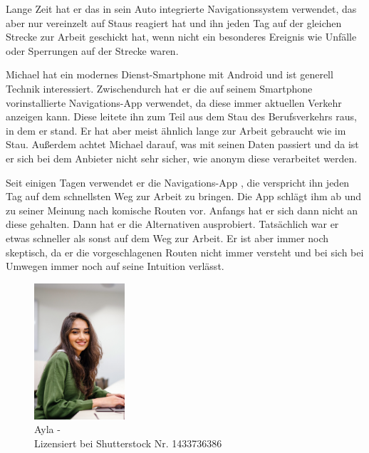 Lange Zeit hat er das in sein Auto integrierte Navigationssystem verwendet, das aber nur vereinzelt auf Staus reagiert hat und ihn jeden Tag auf der gleichen Strecke zur Arbeit geschickt hat, wenn nicht ein besonderes Ereignis wie Unfälle oder Sperrungen auf der Strecke waren.

Michael hat ein modernes Dienst-Smartphone mit Android und ist generell Technik interessiert. Zwischendurch hat er die auf seinem Smartphone vorinstallierte Navigations-App verwendet, da diese immer aktuellen Verkehr anzeigen kann. Diese leitete ihn zum Teil aus dem Stau des Berufsverkehrs raus, in dem er stand. Er hat aber meist ähnlich lange zur Arbeit gebraucht wie im Stau. Außerdem achtet Michael darauf, was mit seinen Daten passiert und da ist er sich bei dem Anbieter nicht sehr sicher, wie anonym diese verarbeitet werden.

Seit einigen Tagen verwendet er die Navigations-App , die verspricht ihn jeden Tag auf dem schnellsten Weg zur Arbeit zu bringen. Die App schlägt ihm ab und zu seiner Meinung nach \glqq komische\grqq{} Routen vor. Anfangs hat er sich dann nicht an diese gehalten. Dann hat er die Alternativen ausprobiert. Tatsächlich war er etwas schneller als sonst auf dem Weg zur Arbeit. Er ist aber immer noch skeptisch, da er die vorgeschlagenen Routen nicht immer versteht und bei sich bei Umwegen immer noch auf seine Intuition verlässt.

\bigbreak

\begin{figure}
    \vspace{-\intextsep}
    \centering
    \includegraphics[width=0.3\textwidth]{contents/06_model_evaluation/01_integration/res/persona_picture_ayla.png}
    \caption{Ayla -\\Lizensiert bei Shutterstock Nr. 1433736386}
\end{figure}

